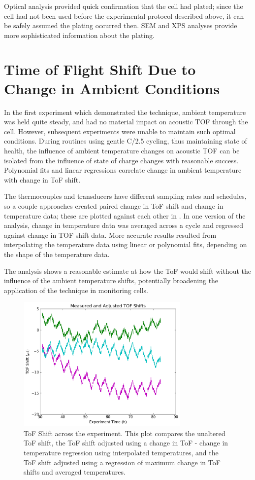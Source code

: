 Optical analysis provided quick confirmation that the cell had plated; since the cell had not been used before the experimental protocol described above, it can be safely assumed the plating occurred then. SEM and XPS analyses provide more sophisticated information about the plating. 

\section{Time of Flight Shift Due to Change in Ambient Conditions}
In the first experiment which demonstrated the technique, ambient temperature was held quite steady, and had no material impact on acoustic TOF through the cell. 
However, subsequent experiments were unable to maintain such optimal conditions.
During routines using gentle C/2.5 cycling, thus maintaining state of health, the influence of ambient temperature changes on acoustic TOF can be isolated from the influence of state of charge changes with reasonable success. 
Polynomial fits and linear regressions correlate change in ambient temperature with change in ToF shift. 

The thermocouples and transducers have different sampling rates and schedules, so a couple approaches created paired change in ToF shift and change in temperature data; these are plotted against each other in . 
In one version of the analysis, change in temperature data was averaged across a cycle and regressed against change in TOF shift data. 
More accurate results resulted from interpolating the temperature data using linear or polynomial fits, depending on the shape of the temperature data.

The analysis shows a reasonable estimate at how the ToF would shift without the influence of the ambient temperature shifts, potentially broadening the application of the technique in monitoring cells.
\begin{figure}[t]\label{fig:0417tofshiftadj}
\includegraphics[width=0.75\textwidth]{Thesis/0417tofshiftadj.png}
\centering
\caption{ToF Shift across the experiment. This plot compares the unaltered ToF shift, the ToF shift adjusted using a change in ToF - change in temperature regression using interpolated temperatures, and the ToF shift adjusted using a regression of maximum change in ToF shifts and averaged temperatures.}
\end{figure}


